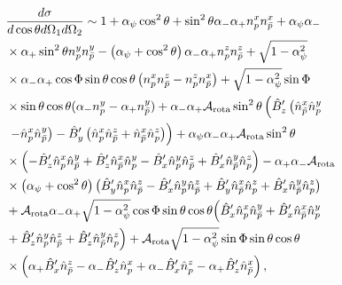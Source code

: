 \begin{equation}
    \label{eq:pdf}
    \begin{split}
        &\frac{d\sigma}{d \cos\theta d\Omega_{1} d\Omega_{2}}
        \sim  1+ \alpha _{\psi } \cos^2\theta
        + \sin ^2\theta \alpha_- \alpha_+ n_{p}^{x} n_{\bar{p}}^x
        + \alpha_{\psi}  \alpha_{-}  \\
        & \times \alpha_{+} \sin^2\theta
        n_{p}^y n_{\bar{p}}^y 
        - \left( \alpha_{\psi} +\cos^2 \theta  \right) \alpha_- \alpha_+ 
        n_{p}^z n_{\bar{p}}^z
        + \sqrt{1-\alpha_{\psi}^2}  \\
        & \times \alpha_- \alpha_+  \cos\Phi  \sin\theta
        \cos\theta 
        \left( n_{p}^x n_{\bar{p}}^z  - n_{p}^z n_{\bar{p}}^x\right)
        +\sqrt{1-\alpha _{\psi}^2} \sin\Phi\\ 
        & \times   \sin\theta \cos\theta  
        (\alpha_- n_{p}^y - \alpha_+ n_{\bar{p}}^y)
        + \alpha _- \alpha _+ \mathcal{A}_{\rm rota}  \sin ^2\theta
        \left(\hat{B}'_z \left(\hat{n}_{\bar{p}}^x
        \hat{n}_{p}^y \right. \right.  \\
        & \left. \left. -\hat{n}_{p}^x \hat{n}_{\bar{p}}^y\right)-\hat{B}'_y
        \left(\hat{n}_{p}^x \hat{n}_{\bar{p}}^z+\hat{n}_{\bar{p}}^x
        \hat{n}_{p}^z\right)\right)
        + \alpha_{\psi}
        \alpha _- \alpha _+ \mathcal{A}_{\rm rota} \sin^2\theta 
        \\ & \times \left(-\hat{B}'_z \hat{n}_{p}^x
        \hat{n}_{\bar{p}}^y+\hat{B}'_z \hat{n}_{\bar{p}}^x \hat{n}_{p}^y-\hat{B}'_x
        \hat{n}_{p}^y \hat{n}_{\bar{p}}^z+\hat{B}'_x \hat{n}_{\bar{p}}^y
        \hat{n}_{p}^z\right)
        - \alpha _+  \alpha _- \mathcal{A}_{\rm rota} 
        \\ & \times   \left( \alpha_{\psi} +\cos^2 \theta  \right)
        \big(\hat{B}'_y \hat{n}_{p}^x
        \hat{n}_{\bar{p}}^z
        -\hat{B}'_x \hat{n}_{p}^y \hat{n}_{\bar{p}}^z
        +\hat{B}'_y
        \hat{n}_{\bar{p}}^x \hat{n}_{p}^z+\hat{B}'_x \hat{n}_{\bar{p}}^y
        \hat{n}_{p}^z \big)
        \\ & + \mathcal{A}_{\rm rota}  \alpha _- \alpha _+ \sqrt{1-\alpha_{\psi}^2} \cos\Phi  \sin\theta
        \cos\theta \Big(\hat{B}'_x \hat{n}_{p}^x
        \hat{n}_{\bar{p}}^y+\hat{B}'_x \hat{n}_{\bar{p}}^x \hat{n}_{p}^y
        \\ &
        +\hat{B}'_z
        \hat{n}_{p}^y \hat{n}_{\bar{p}}^z
        +\hat{B}'_z \hat{n}_{\bar{p}}^y
        \hat{n}_{p}^z\Big)
        + \mathcal{A}_{\rm rota} \sqrt{1-\alpha _{\psi}^2}
        \sin\Phi  \sin\theta \cos\theta    \\
        & \times \left(
        \alpha_+ \hat{B}'_x \hat{n}_{\bar{p}}^z
        -\alpha _- \hat{B}'_z \hat{n}_{p}^x+\alpha _-
        \hat{B}'_x \hat{n}_{p}^z
        - \alpha _+ \hat{B}'_z \hat{n}_{\bar{p}}^x
        \right)
        ,
    \end{split}
\end{equation}
